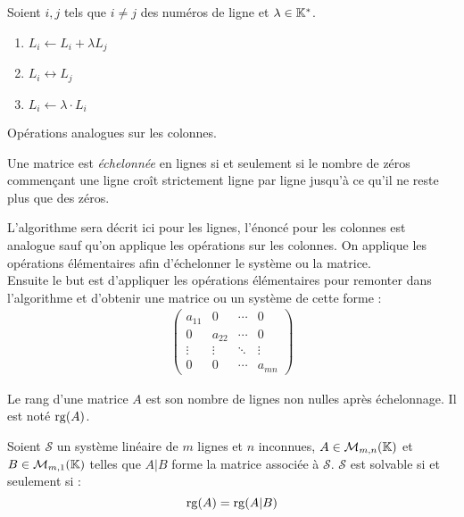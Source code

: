 \begin{definition}
	Soient $i, j$ tels que $i \neq j$ des numéros de ligne et $\lambda \in \mathbb{K}^*$.
	\begin{multicols}{2}
        \begin{enumerate}
		\item $L_i \leftarrow L_i + \lambda L_j$ 
		\item $L_i \leftrightarrow L_j$
		\item $L_i \leftarrow \lambda \cdot L_i$
	\end{enumerate}
    \end{multicols}
	Opérations analogues sur les colonnes.
\end{definition}

\begin{definition}
	Une matrice est \emph{échelonnée} en lignes si et seulement si le nombre de zéros commençant une ligne croît strictement ligne par ligne jusqu'à ce qu'il ne reste plus que des zéros.
\end{definition}

\begin{proposition}
    L'algorithme sera décrit ici pour les lignes, l'énoncé pour les colonnes est analogue sauf qu'on applique les opérations sur les colonnes.
   	On applique les opérations élémentaires afin d'échelonner le système ou la matrice.
    \\
    Ensuite le but est d'appliquer les opérations élémentaires pour \og remonter \fg dans l'algorithme et d'obtenir une matrice ou un système de cette forme :
    \begin{align*}
        \begin{pmatrix}
            a_{11} & 0 & \cdots & 0 \\
            0 & a_{22} & \cdots & 0 \\ 
            \vdots & \vdots & \ddots & \vdots \\ 
            0 & 0 & \cdots & a_{mn}
        \end{pmatrix}
    \end{align*}
\end{proposition}

\begin{definition}
	Le rang d'une matrice $A$ est son nombre de lignes non nulles après échelonnage. Il est noté $\operatorname{rg}(A)$.
\end{definition}

\begin{theorem}
    Soient $\mathcal{S}$ un système linéaire de $m$ lignes et $n$ inconnues, $A \in \mathcal{M}_{m,n}(\mathbb{K})$ et $B \in \mathcal{M}_{m,1}(\mathbb{K})$ telles que $A|B$ forme la matrice associée à $\mathcal{S}$. $\mathcal{S}$ est solvable si et seulement si :
    \[ \operatorname{rg}(A) = \operatorname{rg}(A|B) \]
\end{theorem}

